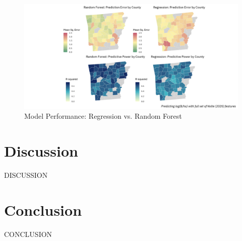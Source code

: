 \documentclass[12pt]{article}
\begin{document}
\begin{figure}
    \centering
    \includegraphics[width=6in]{eda_images/rf_reg_compare.png}
    \caption{Model Performance: Regression vs. Random Forest}
    \label{fig:model_compare}
\end{figure}

\newpage

\section{Discussion}

DISCUSSION

\newpage

\section{Conclusion}

CONCLUSION

\newpage  %


\printbibliography
\end{document}
